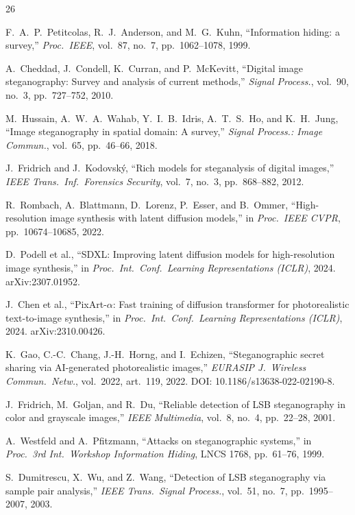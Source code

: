 \documentclass[10pt,twocolumn,a4paper]{article}
\begin{document}
\begin{thebibliography}{26}
\small

F.~A.~P.~Petitcolas, R.~J.~Anderson, and M.~G.~Kuhn,
``Information hiding: a survey,''
\textit{Proc.\ IEEE}, vol.~87, no.~7, pp.~1062--1078, 1999.

A.~Cheddad, J.~Condell, K.~Curran, and P.~McKevitt,
``Digital image steganography: Survey and analysis of current methods,''
\textit{Signal Process.}, vol.~90, no.~3, pp.~727--752, 2010.

M.~Hussain, A.~W.~A.~Wahab, Y.~I.~B.~Idris, A.~T.~S.~Ho, and K.~H.~Jung,
``Image steganography in spatial domain: A survey,''
\textit{Signal Process.: Image Commun.}, vol.~65, pp.~46--66, 2018.

J.~Fridrich and J.~Kodovsk\'{y},
``Rich models for steganalysis of digital images,''
\textit{IEEE Trans.\ Inf.\ Forensics Security}, vol.~7, no.~3, pp.~868--882, 2012.

R.~Rombach, A.~Blattmann, D.~Lorenz, P.~Esser, and B.~Ommer,
``High-resolution image synthesis with latent diffusion models,''
in \textit{Proc.\ IEEE CVPR}, pp.~10674--10685, 2022.

D.~Podell et al.,
``SDXL: Improving latent diffusion models for high-resolution image synthesis,''
in \textit{Proc.\ Int.\ Conf.\ Learning Representations (ICLR)}, 2024.
arXiv:2307.01952.

J.~Chen et al.,
``PixArt-$\alpha$: Fast training of diffusion transformer for photorealistic text-to-image synthesis,''
in \textit{Proc.\ Int.\ Conf.\ Learning Representations (ICLR)}, 2024.
arXiv:2310.00426.

K.~Gao, C.-C.~Chang, J.-H.~Horng, and I.~Echizen,
``Steganographic secret sharing via AI-generated photorealistic images,''
\textit{EURASIP J.\ Wireless Commun.\ Netw.}, vol.~2022, art.~119, 2022.
DOI: 10.1186/s13638-022-02190-8.

J.~Fridrich, M.~Goljan, and R.~Du,
``Reliable detection of LSB steganography in color and grayscale images,''
\textit{IEEE Multimedia}, vol.~8, no.~4, pp.~22--28, 2001.

A.~Westfeld and A.~Pfitzmann,
``Attacks on steganographic systems,''
in \textit{Proc.\ 3rd Int.\ Workshop Information Hiding}, LNCS 1768, pp.~61--76, 1999.

S.~Dumitrescu, X.~Wu, and Z.~Wang,
``Detection of LSB steganography via sample pair analysis,''
\textit{IEEE Trans.\ Signal Process.}, vol.~51, no.~7, pp.~1995--2007, 2003.


\end{thebibliography}
\end{document}
